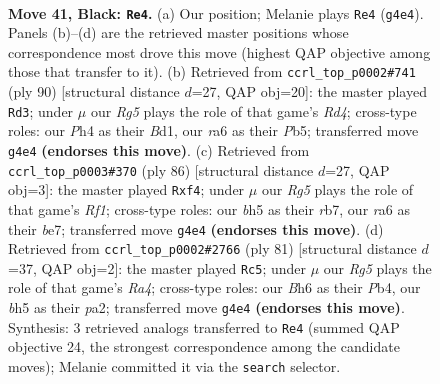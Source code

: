 \documentclass[11pt]{article}
\begin{document}
\clearpage

\begin{figure}[p]\centering
\begin{subfigure}{0.46\textwidth}\centering
\resizebox{\linewidth}{!}{%
\newchessgame
\chessboard[
  setfen={7r/5P2/R1Pk3b/1R5B/1P4rp/8/5K2/8 b - - 4 41},
  showmover=false,
  pgfstyle=straightmove, color=movearrow, markmove={g4-e4}
]}
\caption{}
\end{subfigure}\hfill
\begin{subfigure}{0.46\textwidth}\centering
\resizebox{\linewidth}{!}{%
\newchessgame
\chessboard[
  setfen={5k2/8/4prp1/1P5p/3R3P/4b3/6K1/3B4 w - - 1 46},
  showmover=false,
  pgfstyle=straightmove, color=movearrow, markmove={d4-d3}
]}
\caption{}
\end{subfigure}
\\[4pt]
\begin{subfigure}{0.46\textwidth}\centering
\resizebox{\linewidth}{!}{%
\newchessgame
\chessboard[
  setfen={6k1/1r2b3/7p/p6r/5p2/6P1/R1B3K1/5R2 w - - 0 44},
  showmover=false,
  pgfstyle=straightmove, color=movearrow, markmove={f1-f4}
]}
\caption{}
\end{subfigure}\hfill
\begin{subfigure}{0.46\textwidth}\centering
\resizebox{\linewidth}{!}{%
\newchessgame
\chessboard[
  setfen={6R1/8/5p2/r7/1p2rk2/1P6/P2R1P2/5K2 b - - 9 41},
  showmover=false,
  pgfstyle=straightmove, color=movearrow, markmove={a5-c5}
]}
\caption{}
\end{subfigure}
\caption{\textbf{Move 41, Black: \texttt{Re4}.} (a) Our position; Melanie plays \texttt{Re4} (\texttt{g4e4}). Panels (b)--(d) are the retrieved master positions whose correspondence most drove this move (highest QAP objective among those that transfer to it). (b) Retrieved from \texttt{ccrl\_top\_p0002\#741} (ply 90) [structural distance $d$=27, QAP obj=20]: the master played \texttt{Rd3}; under $\mu$ our \emph{Rg5} plays the role of that game's \emph{Rd4}; cross-type roles: our \emph{P}h4 as their \emph{B}d1, our \emph{r}a6 as their \emph{P}b5; transferred move \texttt{g4e4} \textbf{(endorses this move)}. (c) Retrieved from \texttt{ccrl\_top\_p0003\#370} (ply 86) [structural distance $d$=27, QAP obj=3]: the master played \texttt{Rxf4}; under $\mu$ our \emph{Rg5} plays the role of that game's \emph{Rf1}; cross-type roles: our \emph{b}h5 as their \emph{r}b7, our \emph{r}a6 as their \emph{b}e7; transferred move \texttt{g4e4} \textbf{(endorses this move)}. (d) Retrieved from \texttt{ccrl\_top\_p0002\#2766} (ply 81) [structural distance $d$=37, QAP obj=2]: the master played \texttt{Rc5}; under $\mu$ our \emph{Rg5} plays the role of that game's \emph{Ra4}; cross-type roles: our \emph{B}h6 as their \emph{P}b4, our \emph{b}h5 as their \emph{p}a2; transferred move \texttt{g4e4} \textbf{(endorses this move)}. Synthesis: 3 retrieved analogs transferred to \texttt{Re4} (summed QAP objective 24, the strongest correspondence among the candidate moves); Melanie committed it via the \texttt{search} selector.}
\label{fig:thought-m81}
\end{figure}
\end{document}

